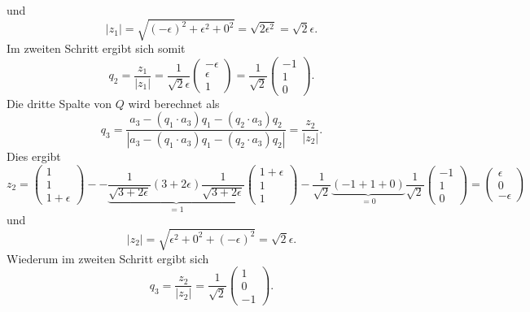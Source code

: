und
\begin{equation*}
|z_1|=\sqrt{(-\epsilon)^2+\epsilon^2+0^2}=\sqrt{2\epsilon^2}=\sqrt{2}\epsilon.
\end{equation*}
Im zweiten Schritt ergibt sich somit
\begin{equation*}
q_2=\frac{z_1}{|z_1|}=\frac{1}{\sqrt{2}\epsilon}
\begin{pmatrix}
-\epsilon\\
\epsilon\\
1
\end{pmatrix}=
\frac{1}{\sqrt{2}}
\begin{pmatrix}
-1\\
1\\
0
\end{pmatrix}.
\end{equation*}
Die dritte Spalte von $Q$ wird berechnet als
\begin{equation*}
q_3=\frac{a_3-(q_1\cdot a_3)q_1-(q_2\cdot a_3)q_2}{|a_3-(q_1\cdot a_3)q_1-(q_2\cdot a_3)q_2|}=\frac{z_2}{|z_2|}.
\end{equation*}
Dies ergibt
\begin{equation*}
z_2=
\begin{pmatrix}
1\\
1\\
1+\epsilon
\end{pmatrix}--\underbrace{\frac{1}{\sqrt{3+2\epsilon}}(3+2\epsilon)\frac{1}{\sqrt{3+2\epsilon}}}_{\displaystyle=1}
\begin{pmatrix}
1+\epsilon\\
1\\
1
\end{pmatrix}-\frac{1}{\sqrt{2}}\underbrace{(-1+1+0)}_{\displaystyle=0}\frac{1}{\sqrt{2}}
\begin{pmatrix}
-1\\
1\\
0
\end{pmatrix}=
\begin{pmatrix}
\epsilon\\
0\\
-\epsilon
\end{pmatrix}
\end{equation*}
und
\begin{equation*}
|z_2|=\sqrt{\epsilon^2+0^2+(-\epsilon)^2}=\sqrt{2}\epsilon.
\end{equation*}
Wiederum im zweiten Schritt ergibt sich
\begin{equation*}
q_3=\frac{z_2}{|z_2|}=\frac{1}{\sqrt{2}}
\begin{pmatrix}
1\\
0\\
-1
\end{pmatrix}.
\end{equation*}
